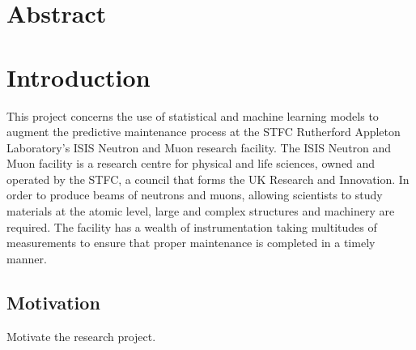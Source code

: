 \documentclass[10pt,oneside]{report}
\begin{document}
\clearpage


\chapter*{Abstract}


\chapter{Introduction}

This project concerns the use of statistical and machine learning models to augment the predictive maintenance process at the STFC Rutherford Appleton Laboratory's ISIS Neutron and Muon research facility. The ISIS Neutron and Muon facility is a research centre for physical and life sciences, owned and operated by the STFC, a council that forms the UK Research and Innovation. In order to produce beams of neutrons and muons, allowing scientists to study materials at the atomic level, large and complex structures and machinery are required. The facility has a wealth of instrumentation taking multitudes of measurements to ensure that proper maintenance is completed in a timely manner. \\


\textbf{ }


\section{Motivation}
Motivate the research project.
\end{document}
